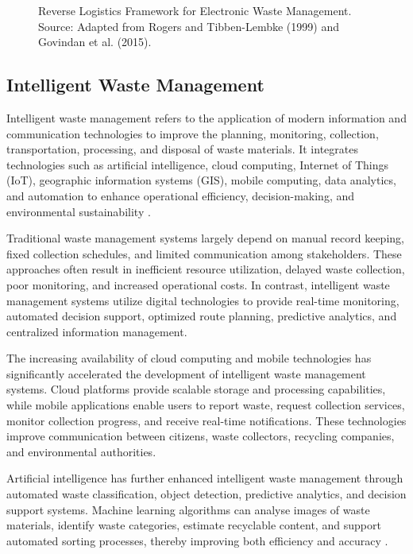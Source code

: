 \begin{figure}[H]
  \centering
  \caption{Reverse Logistics Framework for Electronic Waste Management. Source: Adapted from Rogers and Tibben-Lembke (1999) and Govindan et al. (2015).}
  \label{fig:reverse-logistics}
\end{figure}

\subsection{Intelligent Waste Management}

Intelligent waste management refers to the application of modern information and
communication technologies to improve the planning, monitoring, collection,
transportation, processing, and disposal of waste materials. It integrates
technologies such as artificial intelligence, cloud computing, Internet of Things
(IoT), geographic information systems (GIS), mobile computing, data analytics, and
automation to enhance operational efficiency, decision-making, and environmental
sustainability \citep{belhadi2021,sharma2023}.

Traditional waste management systems largely depend on manual record
keeping, fixed collection schedules, and limited communication among
stakeholders. These approaches often result in inefficient resource utilization,
delayed waste collection, poor monitoring, and increased operational costs. In
contrast, intelligent waste management systems utilize digital technologies to
provide real-time monitoring, automated decision support, optimized route
planning, predictive analytics, and centralized information management.

The increasing availability of cloud computing and mobile technologies has
significantly accelerated the development of intelligent waste management
systems. Cloud platforms provide scalable storage and processing capabilities,
while mobile applications enable users to report waste, request collection services,
monitor collection progress, and receive real-time notifications. These
technologies improve communication between citizens, waste collectors, recycling
companies, and environmental authorities.

Artificial intelligence has further enhanced intelligent waste management
through automated waste classification, object detection, predictive analytics, and
decision support systems. Machine learning algorithms can analyse images of
waste materials, identify waste categories, estimate recyclable content, and
support automated sorting processes, thereby improving both efficiency and
accuracy \citep{abdallah2022}.

